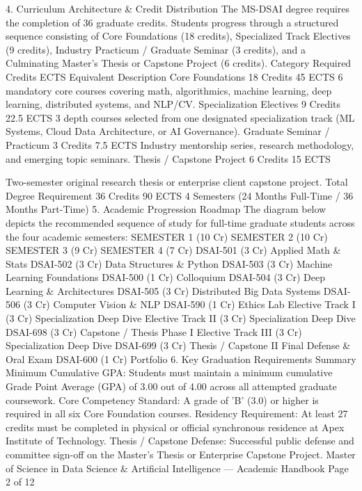 \documentclass[12pt]{article}
\begin{document}
4. Curriculum Architecture \& Credit Distribution
The MS-DSAI degree requires the completion of 36 graduate credits. Students progress through a structured
sequence consisting of Core Foundations (18 credits), Specialized Track Electives (9 credits), Industry Practicum /
Graduate Seminar (3 credits), and a Culminating Master's Thesis or Capstone Project (6 credits).
Category
Required
Credits
ECTS
Equivalent
Description
Core Foundations
18 Credits
45 ECTS
6 mandatory core courses covering math, algorithmics, machine
learning, deep learning, distributed systems, and NLP/CV.
Specialization
Electives
9 Credits
22.5 ECTS
3 depth courses selected from one designated specialization track
(ML Systems, Cloud Data Architecture, or AI Governance).
Graduate Seminar /
Practicum
3 Credits
7.5 ECTS
Industry mentorship series, research methodology, and emerging
topic seminars.
Thesis / Capstone
Project
6 Credits
15 ECTS

Two-semester original research thesis or enterprise client capstone
project.
Total Degree
Requirement
36 Credits
90 ECTS
4 Semesters (24 Months Full-Time / 36 Months Part-Time)
5. Academic Progression Roadmap
The diagram below depicts the recommended sequence of study for full-time graduate students across the four
academic semesters:
SEMESTER 1 (10 Cr)
SEMESTER 2 (10 Cr)
SEMESTER 3 (9 Cr)
SEMESTER 4 (7 Cr)
DSAI-501 (3 Cr)
Applied Math \& Stats
DSAI-502 (3 Cr)
Data Structures \& Python
DSAI-503 (3 Cr)
Machine Learning Foundations
DSAI-500 (1 Cr) Colloquium
DSAI-504 (3 Cr)
Deep Learning \& Architectures
DSAI-505 (3 Cr)
Distributed Big Data Systems
DSAI-506 (3 Cr)
Computer Vision \& NLP
DSAI-590 (1 Cr) Ethics Lab
Elective Track I (3 Cr)
Specialization Deep Dive
Elective Track II (3 Cr)
Specialization Deep Dive
DSAI-698 (3 Cr)
Capstone / Thesis Phase I
Elective Track III (3 Cr)
Specialization Deep Dive
DSAI-699 (3 Cr)
Thesis / Capstone II
Final Defense \& Oral Exam
DSAI-600 (1 Cr) Portfolio
6. Key Graduation Requirements Summary
Minimum Cumulative GPA: Students must maintain a minimum cumulative Grade Point Average (GPA) of 3.00 out of
4.00 across all attempted graduate coursework.
Core Competency Standard: A grade of 'B' (3.0) or higher is required in all six Core Foundation courses.
Residency Requirement: At least 27 credits must be completed in physical or official synchronous residence at Apex
Institute of Technology.
Thesis / Capstone Defense: Successful public defense and committee sign-off on the Master's Thesis or Enterprise
Capstone Project.
Master of Science in Data Science \& Artificial Intelligence — Academic Handbook
Page 2 of 12
\end{document}

